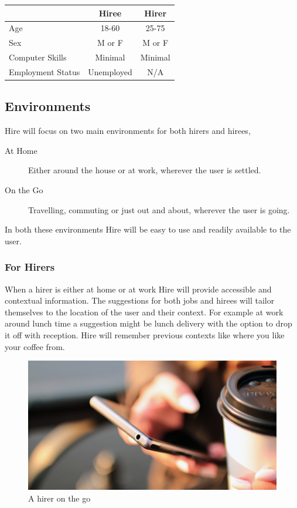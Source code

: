 \documentclass[11pt]{article}
\begin{document}
\begin{center}
  \begin{tabular}{| l | c | c |}
  \hline
    & Hiree & Hirer \\ \hline
    Age & 18-60 & 25-75 \\ \hline
    Sex & M or F & M or F \\ \hline
    Computer Skills & Minimal & Minimal \\ \hline
    Employment Status & Unemployed & N/A\\
    \hline
  \end{tabular}
\end{center}

\subsection{Environments}



Hire will focus on two main environments for both hirers and hirees,

\begin{description}
    \item[At Home] Either around the house or at work, wherever the user is settled.
    \item[On the Go] Travelling, commuting or just out and about, wherever the user is going.
\end{description}

In both these environments Hire will be easy to use and readily available to the user.

\subsubsection{For Hirers}

When a hirer is either at home or at work Hire will provide accessible and contextual information. The suggestions for both jobs and hirees will tailor themselves to the location of the user and their context. For example at work around lunch time a suggestion might be lunch delivery with the option to drop it off with reception. Hire will remember previous contexts like where you like your coffee from.


\begin{figure}[htb]
\begin{center}
\hspace*{-4cm}
\includegraphics[width=1.5\textwidth]{Img/hands-coffee-smartphone-technology}
\end{center}
\caption{A hirer on the go}
\end{figure}
\end{document}
